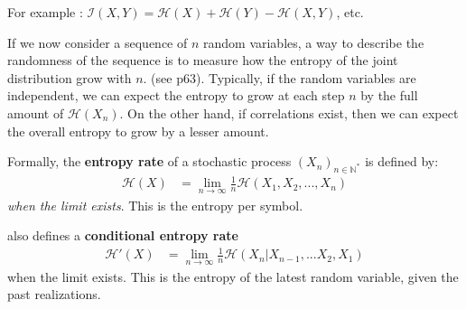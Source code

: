 \begin{figure}[h]
\begin{centering}
\end{centering}
\end{figure}

For example : $\mathcal{I}(X,Y) = \mathcal{H}(X) + \mathcal{H}(Y) - \mathcal{H}(X,Y)$, etc.

If we now consider a sequence of $n$ random variables, a way to describe the randomness of the sequence is to measure how the entropy of the joint distribution grow with $n$. (see \cite{cover_elements_2006} p63). Typically, if the random variables are independent, we can expect the entropy to grow at each step $n$ by the full amount of $\mathcal{H}(X_n)$. On the other hand, if correlations exist, then we can expect the overall entropy to grow by a lesser amount.

Formally, the \textbf{entropy rate} of a stochastic process $(X_n)_{n \in \mathbb{N}^*}$ is defined by:
\begin{align}
    \label{entropy_rate}
    \mathcal{H}(X) &= \underset{n \rightarrow \infty}{\lim} \frac{1}{n} \mathcal{H}(X_1, X_2, ..., X_n) 
\end{align}
\textit{when the limit exists}. This is the entropy per symbol.

\cite{cover_elements_2006} also defines a \textbf{conditional entropy rate}
\begin{align}
    \label{cond_entropy_rate}
    \mathcal{H}'(X) &= \underset{n \rightarrow \infty}{\lim} \frac{1}{n} \mathcal{H}(X_n \vert X_{n-1},...X_2, X_1)
\end{align}
when the limit exists. This is the entropy of the latest random variable, given the past realizations.

